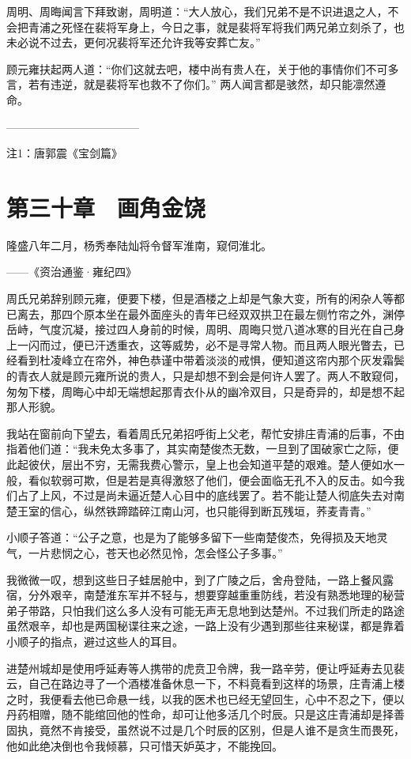周明、周晦闻言下拜致谢，周明道：“大人放心，我们兄弟不是不识进退之人，不会把青浦之死怪在裴将军身上，今日之事，就是裴将军将我们两兄弟立刻杀了，也未必说不过去，更何况裴将军还允许我等安葬亡友。”

顾元雍扶起两人道：“你们这就去吧，楼中尚有贵人在，关于他的事情你们不可多言，若有违逆，就是裴将军也救不了你们。” 两人闻言都是骇然，却只能凛然遵命。

————————————

注1：唐郭震《宝剑篇》

\chapter{第三十章　画角金饶}

隆盛八年二月，杨秀奉陆灿将令督军淮南，窥伺淮北。

——《资治通鉴·雍纪四》

周氏兄弟辞别顾元雍，便要下楼，但是酒楼之上却是气象大变，所有的闲杂人等都已离去，那四个原本坐在最外面座头的青年已经双双拱卫在最左侧竹帘之外，渊停岳峙，气度沉凝，接过四人身前的时候，周明、周晦只觉八道冰寒的目光在自己身上一闪而过，便已汗透重衣，这等威势，必不是寻常人物。而且两人眼光瞥去，已经看到杜凌峰立在帘外，神色恭谨中带着淡淡的戒惧，便知道这帘内那个灰发霜鬓的青衣人就是顾元雍所说的贵人，只是却想不到会是何许人罢了。两人不敢窥伺，匆匆下楼，周晦心中却无端想起那青衣仆从的幽冷双目，只是奇异的，却是想不起那人形貌。

我站在窗前向下望去，看着周氏兄弟招呼街上父老，帮忙安排庄青浦的后事，不由指着他们道：“我未免太多事了，其实南楚俊杰无数，一旦到了国破家亡之际，便此起彼伏，层出不穷，无需我费心警示，皇上也会知道平楚的艰难。楚人便如水一般，看似软弱可欺，但是若是真得激怒了他们，便会面临无孔不入的反击。如今我们占了上风，不过是尚未逼近楚人心目中的底线罢了。若不能让楚人彻底失去对南楚王室的信心，纵然铁蹄踏碎江南山河，也只能得到断瓦残垣，荞麦青青。”

小顺子答道：“公子之意，也是为了能够多留下一些南楚俊杰，免得损及天地灵气，一片悲悯之心，苍天也必然见怜，怎会怪公子多事。”

我微微一叹，想到这些日子蛙居舱中，到了广陵之后，舍舟登陆，一路上餐风露宿，分外艰辛，南楚淮东军并不轻与，想要穿越重重防线，若没有熟悉地理的秘营弟子带路，只怕我们这么多人没有可能无声无息地到达楚州。不过我们所走的路途虽然艰辛，却也是两国秘谍往来之途，一路上没有少遇到那些往来秘谍，都是靠着小顺子的指点，避过这些人的耳目。

进楚州城却是使用呼延寿等人携带的虎贲卫令牌，我一路辛劳，便让呼延寿去见裴云，自己在路边寻了一个酒楼准备休息一下，不料竟看到这样的场景，庄青浦上楼之时，我便看去他已命悬一线，以我的医术也已经无望回生，心中不忍之下，便以丹药相赠，随不能绾回他的性命，却可让他多活几个时辰。只是这庄青浦却是择善固执，竟然不肯接受，虽然说不过是几个时辰的区别，但是人谁不是贪生而畏死，他如此绝决倒也令我倾慕，只可惜天妒英才，不能挽回。

